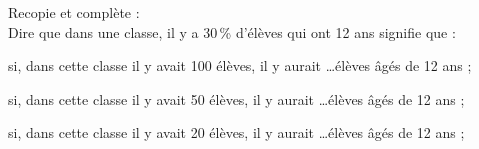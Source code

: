 Recopie et complète :
\\\og{}Dire que dans une classe, il y a 30\,\% d'élèves qui ont 12 ans\fg{} signifie que :
\begin{myenumerate}
  \item si, dans cette classe il y avait 100 élèves, il y aurait \ldots élèves âgés de 12 ans ;
  \item si, dans cette classe il y avait 50 élèves, il y aurait \ldots élèves âgés de 12 ans ;
  \item si, dans cette classe il y avait 20 élèves, il y aurait \ldots élèves âgés de 12 ans ;
\end{myenumerate}
